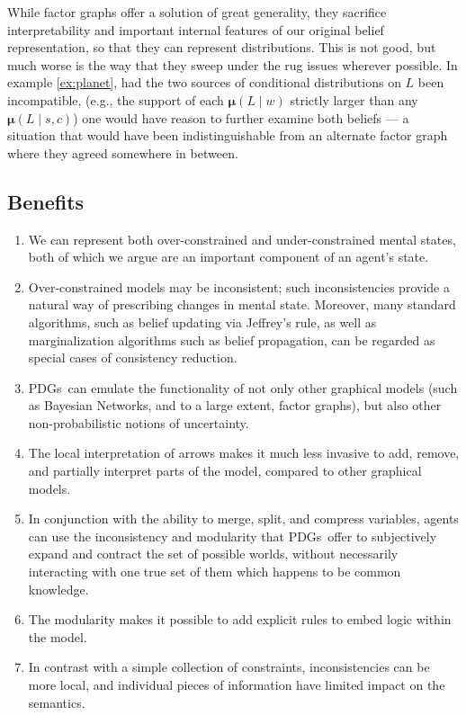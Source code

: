 \documentclass{article}
\newcommand\changed[1]{{\color{note-fg} #1}}
\newcommand{\MNs}{PDGs}
\newcommand\bmu{\boldsymbol{\mu}}
\begin{document}
	While factor graphs offer a solution of great generality, they sacrifice interpretability and important internal features of our original belief representation, so that they can represent distributions.	
	This is not good, but much worse is the way that they sweep under the rug issues wherever possible. In example \ref{ex:planet}, had the two sources of conditional distributions on $L$ been incompatible, (e.g., the support of each $\bmu(L\mid w)$ strictly larger than any $\bmu(L\mid s,c)$) one would have reason to further examine both beliefs --- a situation that would have been indistinguishable from an alternate factor graph where they agreed somewhere in between.
	
	\subsection{Benefits}\label{sec:list-of-benefits}
	\begin{enumerate}[nosep]
		\item We can represent both over-constrained and under-constrained mental states, both of which we argue are an important component of an agent's state.
		\item Over-constrained models may be inconsistent; such inconsistencies provide a natural way of prescribing changes in mental state. Moreover, many standard algorithms, such as belief updating via Jeffrey's rule, as well as marginalization algorithms such as belief propagation, can be regarded as special cases of consistency reduction.
		\item \MNs\ can emulate the functionality of not only other graphical models (such as Bayesian Networks, and to a large extent, factor graphs), but also other non-probabilistic notions of uncertainty.
		\item The local interpretation of arrows makes it much less invasive to add, remove, and partially interpret parts of the model, compared to other graphical models.
		\item In conjunction with the ability to merge, split, and compress variables, agents can use the inconsistency and modularity that \MNs\ offer to subjectively expand and contract the set of possible worlds, without necessarily interacting with one true set of them which happens to be common knowledge. %
		\item The modularity makes it possible to add explicit rules to embed logic within the model.
		\item In contrast with a simple collection of constraints, inconsistencies \changed{can be more local, and individual pieces of information have limited impact on the semantics.}
	\end{enumerate} %
\end{document}
